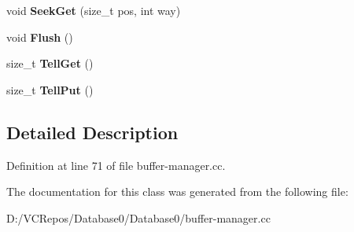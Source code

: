 \begin{DoxyCompactItemize}
void {\bfseries Seek\+Get} (size\+\_\+t pos, int way)
\item 
\mbox{\label{class_f_stream_a00740ae20d82bfe57e88cf0106ec2ba5}} 
void {\bfseries Flush} ()
\item 
\mbox{\label{class_f_stream_a424b5df4a380ad2951a9c1728b0712ff}} 
size\+\_\+t {\bfseries Tell\+Get} ()
\item 
\mbox{\label{class_f_stream_a41b7a1de3138d0896f27bd269cf3e21d}} 
size\+\_\+t {\bfseries Tell\+Put} ()
\end{DoxyCompactItemize}


\subsection{Detailed Description}


Definition at line 71 of file buffer-\/manager.\+cc.



The documentation for this class was generated from the following file\+:\begin{DoxyCompactItemize}
\item 
D\+:/\+V\+C\+Repos/\+Database0/\+Database0/buffer-\/manager.\+cc\end{DoxyCompactItemize}
